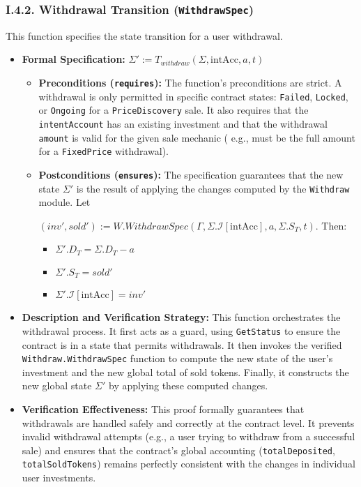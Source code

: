 \documentclass[
  english,
  onecolumn]{article}
\providecommand{\tightlist}{%
  \setlength{\itemsep}{0pt}\setlength{\parskip}{0pt}}
\begin{document}
\subsubsection{\texorpdfstring{I.4.2. Withdrawal Transition
(\texttt{WithdrawSpec})}{I.4.2. Withdrawal Transition (WithdrawSpec)}}\label{i.4.2.-withdrawal-transition-withdrawspec}

This function specifies the state transition for a user withdrawal.

\begin{itemize}
\tightlist
\item
  \textbf{Formal Specification:}
  \(\Sigma' := T_{withdraw}(\Sigma, \text{intAcc}, a, t)\)

  \begin{itemize}
  \item
    \textbf{Preconditions (\texttt{requires}):} The function's
    preconditions are strict. A withdrawal is only permitted in specific
    contract states: \texttt{Failed}, \texttt{Locked}, or
    \texttt{Ongoing} for a \texttt{PriceDiscovery} sale. It also
    requires that the \texttt{intentAccount} has an existing investment
    and that the withdrawal \texttt{amount} is valid for the given sale
    mechanic ( e.g., must be the full amount for a \texttt{FixedPrice}
    withdrawal).
  \item
    \textbf{Postconditions (\texttt{ensures}):} The specification
    guarantees that the new state \(\Sigma'\) is the result of applying
    the changes computed by the \texttt{Withdraw} module. Let

    \((inv', sold') := W.WithdrawSpec(\Gamma, \Sigma.\mathcal{I}[\text{intAcc}], a, \Sigma.S_T, t)\).
    Then:

    \begin{itemize}
    \tightlist
    \item
      \(\Sigma'.D_T = \Sigma.D_T - a\)
    \item
      \(\Sigma'.S_T = sold'\)
    \item
      \(\Sigma'.\mathcal{I}[\text{intAcc}] = inv'\)
    \end{itemize}
  \end{itemize}
\item
  \textbf{Description and Verification Strategy:} This function
  orchestrates the withdrawal process. It first acts as a guard, using
  \texttt{GetStatus} to ensure the contract is in a state that permits
  withdrawals. It then invokes the verified
  \texttt{Withdraw.WithdrawSpec} function to compute the new state of
  the user's investment and the new global total of sold tokens.
  Finally, it constructs the new global state \(\Sigma'\) by applying
  these computed changes.
\item
  \textbf{Verification Effectiveness:} This proof formally guarantees
  that withdrawals are handled safely and correctly at the contract
  level. It prevents invalid withdrawal attempts (e.g., a user trying to
  withdraw from a successful sale) and ensures that the contract's
  global accounting (\texttt{totalDeposited}, \texttt{totalSoldTokens})
  remains perfectly consistent with the changes in individual user
  investments.
\end{itemize}
\end{document}
